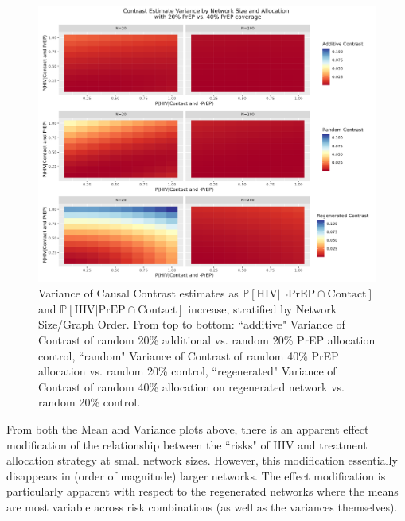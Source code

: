 \documentclass{article}
\theoremstyle{definition}
\begin{document}
\begin{figure}[H]
    \centering
    \includegraphics[width=\linewidth]{Corrected Figures/Network Size Variance plots.png}
    \caption{Variance of Causal Contrast estimates  as $\mathbb{P}\left[\text{HIV} \vert \neg \text{PrEP} \cap \text{Contact}\right]$ and $\mathbb{P}\left[\text{HIV} \vert \text{PrEP} \cap \text{Contact}\right]$ increase, stratified by Network Size/Graph Order. From top to bottom: ``additive" Variance of Contrast of random 20\% additional vs. random 20\% PrEP allocation control, ``random" Variance of Contrast of random 40\% PrEP allocation vs. random 20\% control, ``regenerated" Variance of Contrast of random 40\% allocation on regenerated network vs. random 20\% control.}
    \label{fig:Figure S4.2}
\end{figure}
From both the Mean and Variance plots above, there is an apparent effect modification of the relationship between the ``risks" of HIV and treatment allocation strategy at small network sizes. However, this modification essentially disappears in (order of magnitude) larger networks. The effect modification is particularly apparent with respect to the regenerated networks where the means are most variable across risk combinations (as well as the variances themselves).  
\end{document}
